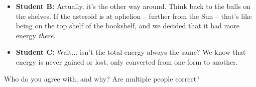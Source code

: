 \documentclass[12pt]{article}
\begin{document}
\begin{enumerate}
\begin{itemize}
\item {\bf Student B:} Actually, it's the other way around. Think back to the balls on the
shelves. If the asteroid is at aphelion -- further from the Sun -- that's like 
being on the top shelf of the bookshelf, and we decided that it had more energy
{\it there}.

\item {\bf Student C:} Wait... isn't the total energy always the same? We know that
energy is never gained or lost, only converted from one form to another.

\end{itemize}

Who do you agree with, and why? Are multiple people correct?

\end{enumerate}
\end{document}
